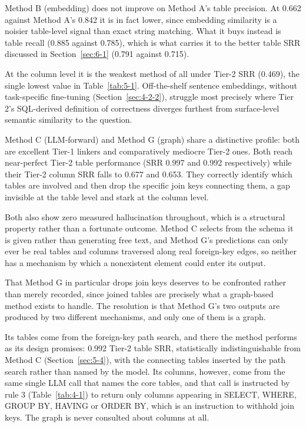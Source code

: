 Method B (embedding) does not improve on Method A's table precision. At 0.662 against Method A's 0.842 it is in fact lower, since embedding similarity is a noisier table-level signal than exact string matching. What it buys instead is table recall (0.885 against 0.785), which is what carries it to the better table SRR discussed in Section~\ref{sec:6-1} (0.791 against 0.715).

At the column level it is the weakest method of all under Tier-2 SRR (0.469), the single lowest value in Table~\ref{tab:5-1}. Off-the-shelf sentence embeddings, without task-specific fine-tuning (Section~\ref{sec:4-2-2}), struggle most precisely where Tier 2's SQL-derived definition of correctness diverges furthest from surface-level semantic similarity to the question.

Method C (LLM-forward) and Method G (graph) share a distinctive profile: both are excellent Tier-1 linkers and comparatively mediocre Tier-2 ones. Both reach near-perfect Tier-2 table performance (SRR 0.997 and 0.992 respectively) while their Tier-2 column SRR falls to 0.677 and 0.653. They correctly identify which tables are involved and then drop the specific join keys connecting them, a gap invisible at the table level and stark at the column level.

Both also show zero measured hallucination throughout, which is a structural property rather than a fortunate outcome. Method C selects from the schema it is given rather than generating free text, and Method G's predictions can only ever be real tables and columns traversed along real foreign-key edges, so neither has a mechanism by which a nonexistent element could enter its output.

That Method G in particular drops join keys deserves to be confronted rather than merely recorded, since joined tables are precisely what a graph-based method exists to handle. The resolution is that Method G's two outputs are produced by two different mechanisms, and only one of them is a graph.

Its tables come from the foreign-key path search, and there the method performs as its design promises: 0.992 Tier-2 table SRR, statistically indistinguishable from Method C (Section~\ref{sec:5-4}), with the connecting tables inserted by the path search rather than named by the model. Its columns, however, come from the same single LLM call that names the core tables, and that call is instructed by rule 3 (Table~\ref{tab:4-1}) to return only columns appearing in SELECT, WHERE, GROUP BY, HAVING or ORDER BY, which is an instruction to withhold join keys. The graph is never consulted about columns at all.

